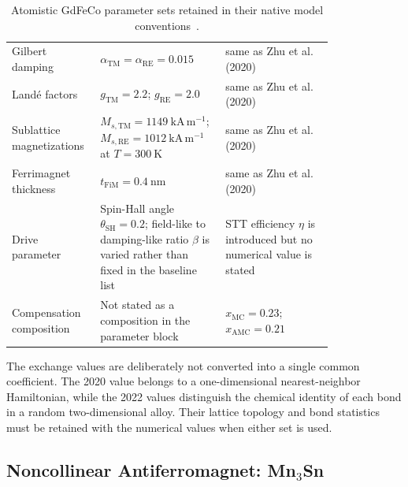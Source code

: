 \begin{table}[htbp]
\begin{tabular}{p{0.19\linewidth}p{0.31\linewidth}p{0.31\linewidth}}
        Gilbert damping
                 & $\alpha_{\mathrm{TM}}=\alpha_{\mathrm{RE}}=0.015$
                 & same as Zhu et al. (2020)                                                              \\
        Land\'e factors
                 & $g_{\mathrm{TM}}=2.2$; $g_{\mathrm{RE}}=2.0$
                 & same as Zhu et al. (2020)                                                              \\
        Sublattice magnetizations
                 & $M_{s,\mathrm{TM}}=1149\ \mathrm{kA\,m^{-1}}$;
        $M_{s,\mathrm{RE}}=1012\ \mathrm{kA\,m^{-1}}$ at
        $T=300\ \mathrm{K}$
                 & same as Zhu et al. (2020)                                                              \\
        Ferrimagnet thickness
                 & $t_{\mathrm{FiM}}=0.4\ \mathrm{nm}$
                 & same as Zhu et al. (2020)                                                              \\
        Drive parameter
                 & Spin-Hall angle $\theta_{\mathrm{SH}}=0.2$; field-like to
        damping-like ratio $\beta$ is varied rather than fixed in the
        baseline list
                 & STT efficiency $\eta$ is introduced but no numerical value is
        stated                                                                                            \\
        Compensation composition
                 & Not stated as a composition in the parameter block
                 & $x_{\mathrm{MC}}=0.23$;
        $x_{\mathrm{AMC}}=0.21$                                                                           \\
        \hline
    \end{tabular}
    \caption{Atomistic GdFeCo parameter sets retained in their native model
        conventions~\cite{zhu2020terahertz,zhang2022spatially}.}
    \label{tab:gdfeco-parameters}
\end{table}

The exchange values are deliberately not converted into a single common
coefficient.  The 2020 value belongs to a one-dimensional nearest-neighbor
Hamiltonian, while the 2022 values distinguish the chemical identity of each
bond in a random two-dimensional alloy.  Their lattice topology and bond
statistics must be retained with the numerical values when either set is used.

\subsection{Noncollinear Antiferromagnet:
    \texorpdfstring{Mn$_3$Sn}{Mn3Sn}}

